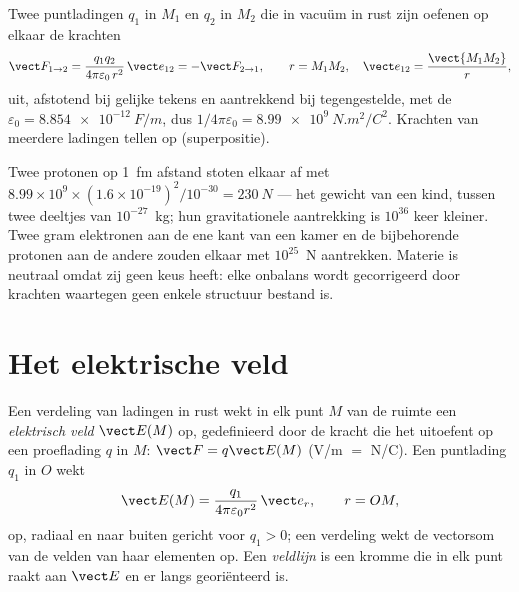 \begin{theorem}\label{thm:b1:electrostatics-gauss:coulomb}
Twee puntladingen $q_1$ in $M_1$ en $q_2$ in $M_2$ die in vacuüm in rust zijn
oefenen op elkaar de krachten
\[
\vect F_{1 \to 2} = \frac{q_1q_2}{4\pi\varepsilon_0\,r^2}\,\vect e_{12} = -\vect F_{2 \to 1},
\qquad r = M_1M_2,\quad \vect e_{12} = \frac{\vect{M_1M_2}}{r},
\]
uit, afstotend bij gelijke tekens en aantrekkend bij tegengestelde, met de
\emph{} $\varepsilon_0 = \qty{8.854e-12}{F/m}$, dus
$1/4\pi\varepsilon_0 = \qty{8.99e9}{N.m^2/C^2}$. Krachten van meerdere ladingen tellen op
(superpositie).
\end{theorem}
\admitted

\begin{example}\label{ex:b1:electrostatics-gauss:strong}
Twee protonen op \qty{1}{fm} afstand stoten elkaar af met $8.99 \times 10^9 \times (1.6 \times
10^{-19})^2/10^{-30} = \qty{230}{N}$ --- het gewicht van een kind, tussen twee
deeltjes van $10^{-27}$~kg; hun gravitationele aantrekking is
$10^{36}$ keer kleiner. Twee gram elektronen aan de ene kant van een kamer
en de bijbehorende protonen aan de andere zouden elkaar met $10^{25}$~N aantrekken.
Materie is neutraal omdat zij geen keus heeft: elke onbalans wordt gecorrigeerd
door krachten waartegen geen enkele structuur bestand is.
\end{example}

\section{Het elektrische veld}

\begin{definition}\label{def:b1:electrostatics-gauss:field}
Een verdeling van ladingen in rust wekt in elk punt $M$ van de ruimte
een \emph{elektrisch veld} $\vect E(M)$ op, gedefinieerd door de kracht die het uitoefent op
een proeflading $q$ in $M$: $\vect F = q\vect E(M)$ (\unit{V/m} $=$
\unit{N/C}). Een puntlading $q_1$ in $O$ wekt
\[
\vect E(M) = \frac{q_1}{4\pi\varepsilon_0 r^2}\,\vect e_r , \qquad r = OM ,
\]
op, radiaal en naar buiten gericht voor $q_1 > 0$; een verdeling wekt de vectorsom van
de velden van haar elementen op. Een \emph{veldlijn} is een kromme die in elk
punt raakt aan $\vect E$ en er langs georiënteerd is.
\end{definition}

